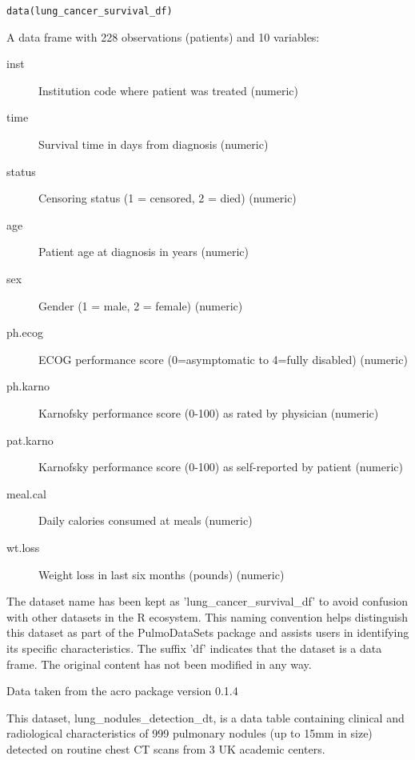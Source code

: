 \documentclass[a4paper]{book}
\begin{document}
%
\begin{Usage}
\begin{verbatim}
data(lung_cancer_survival_df)
\end{verbatim}
\end{Usage}
%
\begin{Format}
A data frame with 228 observations (patients) and 10 variables:
\begin{description}

\item[inst] Institution code where patient was treated (numeric)
\item[time] Survival time in days from diagnosis (numeric)
\item[status] Censoring status (1 = censored, 2 = died) (numeric)
\item[age] Patient age at diagnosis in years (numeric)
\item[sex] Gender (1 = male, 2 = female) (numeric)
\item[ph.ecog] ECOG performance score (0=asymptomatic to 4=fully disabled) (numeric)
\item[ph.karno] Karnofsky performance score (0-100) as rated by physician (numeric)
\item[pat.karno] Karnofsky performance score (0-100) as self-reported by patient (numeric)
\item[meal.cal] Daily calories consumed at meals (numeric)
\item[wt.loss] Weight loss in last six months (pounds) (numeric)

\end{description}

\end{Format}
%
\begin{Details}
The dataset name has been kept as 'lung\_cancer\_survival\_df' to avoid confusion with other datasets
in the R ecosystem. This naming convention helps distinguish this dataset as part of the
PulmoDataSets package and assists users in identifying its specific characteristics.
The suffix 'df' indicates that the dataset is a data frame. The original content has not been modified
in any way.
\end{Details}
%
\begin{Source}
Data taken from the acro package version 0.1.4
\end{Source}
%
\begin{Description}
This dataset, lung\_nodules\_detection\_dt, is a data table containing clinical
and radiological characteristics of 999 pulmonary nodules (up to 15mm in size) detected
on routine chest CT scans from 3 UK academic centers.
\end{Description}
\end{document}
